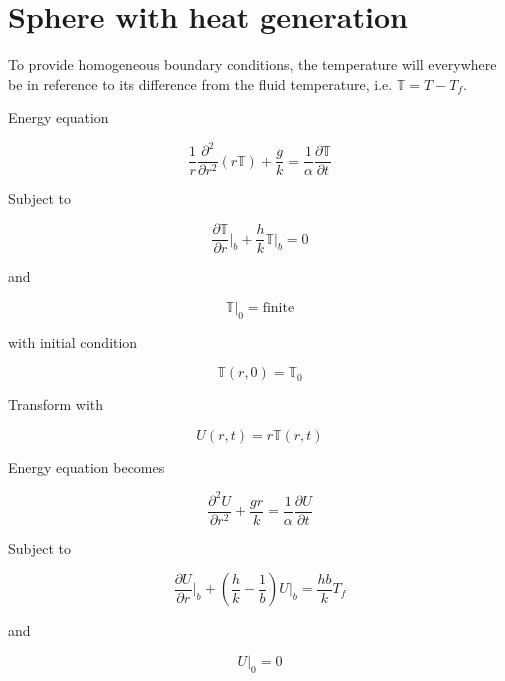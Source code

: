 \section{Sphere with heat generation}

To provide homogeneous boundary conditions, the temperature will everywhere be in reference to its difference from the fluid temperature, i.e. $\mathbb{T} = T-T_f$. 

Energy equation

\begin{equation}
    \frac{1}{r}\frac{\partial^2}{\partial r^2}(r\mathbb{T}) + \frac{g}{k} = \frac{1}{\alpha}\frac{\partial \mathbb{T}}{\partial t}
\end{equation}

Subject to 

\begin{equation}
    \frac{\partial \mathbb{T}}{\partial r}\big|_b + \frac{h}{k}\mathbb{T}|_b = 0
\end{equation}

and

\begin{equation}
    \mathbb{T}|_0 = \text{finite}
\end{equation}

with initial condition

\begin{equation}
    \mathbb{T}(r,0) = \mathbb{T}_0
\end{equation}

Transform with 

\begin{equation}
    U(r,t) = r\mathbb{T}(r,t)
\end{equation}

Energy equation becomes

\begin{equation}
    \frac{\partial^2 U}{\partial r^2} + \frac{gr}{k} = \frac{1}{\alpha}\frac{\partial U}{\partial t}
\end{equation}

Subject to

\begin{equation}
    \frac{\partial U}{\partial r}\big|_b + \left(\frac{h}{k} - \frac{1}{b}\right)U|_b = \frac{hb}{k}T_f
\end{equation}

and

\begin{equation}
    U|_0 = 0
\end{equation}

